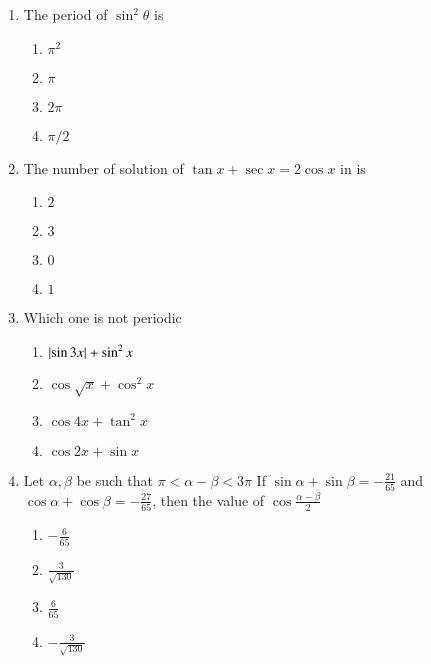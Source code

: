 \documentclass[journal,12pt,twocolumn]{IEEEtran}
\theoremstyle{remark}
\begin{document}
\begin{enumerate}
\item The period of $\sin^2 \theta$ is\hfill{} 
\begin{multicols}{4}
\begin{enumerate}
\item $\pi^2$
\columnbreak
\item $\pi$
\columnbreak
\item $2\pi$
\columnbreak
\item $\pi/2$
\end{enumerate}
\end{multicols}
\item The number of solution of $\tan x + \sec x=2\cos x$ in  is\hfill{} 
\begin{multicols}{4}
\begin{enumerate}
\item $2$
\columnbreak
\item $3$
\columnbreak
\item $0$
\columnbreak
\item $1$
\end{enumerate}
\end{multicols}
\item Which one is not periodic \hfill{}
\begin{multicols}{2} 
\begin{enumerate}
\item $\left\vert\sin3x\right\vert+\sin^2 x$
\item $\cos\sqrt{x}+\cos^2 x$
\columnbreak
\item $\cos4x+\tan^2 x$
\item $\cos2x+\sin x$
\end{enumerate}
\end{multicols}
\item Let $\alpha,\beta$ be such that $\pi<\alpha-\beta<3\pi$
If $\sin\alpha+\sin\beta=-\frac{21}{65}$ and $\cos\alpha+\cos\beta=-\frac{27}{65}$, then the value of $\cos\frac{\alpha-\beta}{2}$\hfill{}
\begin{multicols}{2} 
\begin{enumerate}
\item $-\frac{6}{65}$
\item $\frac{3}{\sqrt{130}}$
\columnbreak
\item $\frac{6}{65}$
\item $-\frac{3}{\sqrt{130}}$
\end{enumerate} 
\end{multicols}

\end{enumerate}
\end{document}
